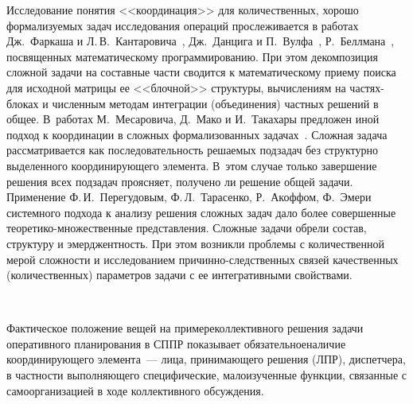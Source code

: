 \begin{multicols}{2}
  Исследование понятия <<координация>> для количественных, хорошо 
формализуемых задач исследования операций прослеживается в работах 
Дж.~Фар\-ка\-ша и Л.\,В.~Кантаровича~\cite{7kol}, Дж.~Данцига и 
П.~Вулфа~\cite{9kol}, Р.~Беллмана~\cite{10kol}, посвященных 
математическому программированию. При этом декомпозиция сложной задачи 
на составные части сводится к математическому приему поиска для исходной 
матрицы ее <<блочной>> структуры, вычислениям на частях-блоках и 
численным методам интеграции (объединения) частных решений в общее. 
В~работах М.~Месаровича, Д.~Мако и И.~Такахары предложен иной подход к 
координации в сложных формализованных задачах~\cite{11kol}. Сложная 
задача рассматривается как последовательность решаемых подзадач без 
структурно выделенного координирующего элемента. В~этом случае только 
завершение решения всех подзадач проясняет, получено ли решение общей 
задачи. Применение Ф.\,И.~Перегудовым, Ф.\,Л.~Тарасенко, Р.~Акоффом, 
Ф.~Эмери~\cite{12kol, 13kol} системного подхода к анализу решения сложных 
задач дало более совершенные теоретико-множественные представления. 
Сложные задачи обрели состав, структуру и эмерджентность. При этом 
возникли проблемы с количественной мерой сложности и исследованием 
  при\-чин\-но-след\-ст\-вен\-ных связей качественных (количественных) 
параметров задачи с ее интегративными свойствами.

\begin{figure*}[b] %
\vspace*{1pt}
\begin{center}
\mbox{%
\epsfxsize=125.904mm
}
\end{center}
\vspace*{-6pt}
  \end{figure*}
  
  Фактическое положение вещей на примере\linebreak коллективного решения задачи 
оперативного планирования в СППР показывает обязательное\linebreak наличие 
координирующего элемента~--- лица, принимающего решения (ЛПР), 
диспетчера, в част\-ности выполняющего специфические, малоизученные 
функции, связанные с самоорганизацией в ходе коллективного обсуждения.
  

\end{multicols}
